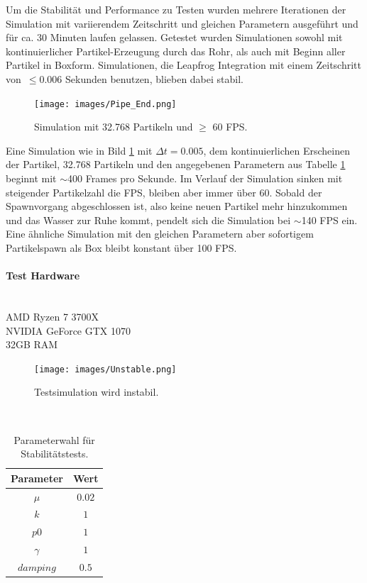 \documentclass[a4paper]{paper}
\begin{document}
Um die Stabilität und Performance zu Testen wurden mehrere Iterationen der Simulation mit variierendem Zeitschritt und gleichen Parametern ausgeführt und für ca. 30 Minuten laufen gelassen. Getestet wurden Simulationen sowohl mit kontinuierlicher Partikel-Erzeugung durch das Rohr, als auch mit Beginn aller Partikel in Boxform. Simulationen, die Leapfrog Integration mit einem Zeitschritt von~$\leq 0.006$ Sekunden benutzen, blieben dabei stabil.

\begin{figure}[t]
	\centering
	\texttt{[image: images/Pipe\_End.png]}
	\caption{Simulation mit 32.768 Partikeln und $\geq$ 60 FPS.}
	\label{fig:final_simulation}
\end{figure}

 Eine Simulation wie in Bild \ref{fig:final_simulation} mit $\Delta t = 0.005$, dem kontinuierlichen Erscheinen der Partikel, 32.768 Partikeln und den angegebenen Parametern aus Tabelle \ref{Parameterwerte} beginnt mit $\sim$400 Frames pro Sekunde. Im Verlauf der Simulation sinken mit steigender Partikelzahl die FPS, bleiben aber immer über 60. Sobald der Spawnvorgang abgeschlossen ist, also keine neuen Partikel mehr hinzukommen und das Wasser zur Ruhe kommt, pendelt sich die Simulation bei $\sim$140 FPS ein.
 Eine ähnliche Simulation mit den gleichen Parametern aber sofortigem Partikelspawn als Box bleibt konstant über 100 FPS.


\paragraph{Test Hardware}\mbox{}\\
AMD Ryzen 7 3700X \\
NVIDIA GeForce GTX 1070\\
32GB RAM\\


\begin{figure}[t]
	
	\centering
	\texttt{[image: images/Unstable.png]}
	\caption{Testsimulation wird instabil.}
	\label{fig:unstable}
\end{figure}

\mbox{}\\
\begin{table}
\begin{center}
	\begin{tabular}{ c|c }
	\hline
	Parameter & Wert \\
	
	\hline
 	$\mu$ & $0.02$\\
	$k$ & $1$\\
	$p0$ & $1$\\
	$\gamma$ & $1$\\
$damping$& $0.5$\\
\hline
	
	\end{tabular}
	\caption{\label{Parameterwerte}Parameterwahl für Stabilitätstests.}
\end{center}
\end{table}
\end{document}

